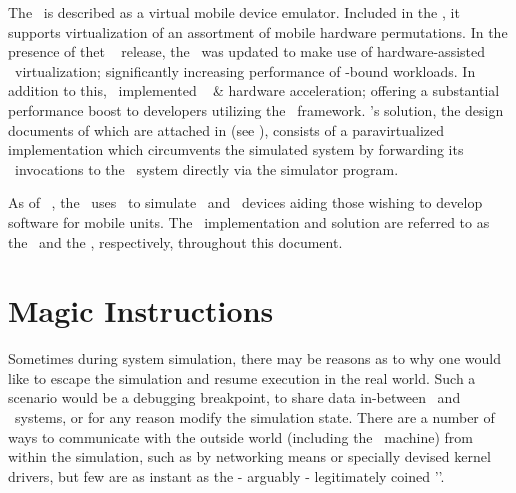 The \dvttermandroidemulator\ is described as a virtual mobile device emulator. Included in the \dvttermandroidsdk , it supports virtualization of an assortment of mobile hardware permutations.
In the presence of thet \dvttermandroid\  release, the \dvttermandroidsdk\ was updated to make use of hardware-assisted \dvttermxeightysix\ virtualization; significantly increasing performance of \dvttermcpu -bound workloads.
In addition to this, \dvttermgoogle\ implemented \dvttermopengles\  \&  hardware acceleration; offering a substantial performance boost to developers utilizing the \dvttermopengles\ framework.
\dvttermgoogle 's solution, the design documents of which are attached in  (see ), consists of a paravirtualized implementation which circumvents the simulated system by forwarding its \dvttermopengles\ invocations to the \dvttermhost\ system directly via the simulator program.

As of \dvttermandroid\ , the \dvttermandroidemulator\ uses \dvttermqemu\ to simulate \dvttermarm\ and \dvttermxeightysix\ devices aiding those wishing to develop software for mobile units.
The \dvttermandroidemulator\ implementation and solution are referred to as the \dvttermreferenceimplementation\ and the \dvttermreferencesolution , respectively, throughout this document.

\section*{Magic Instructions}
\label{sec:appendixa_magicinstructions}
Sometimes during system simulation, there may be reasons as to why one would like to escape the simulation and resume execution in the real world.
Such a scenario would be a debugging breakpoint, to share data in-between \dvttermtarget\ and \dvttermhost\ systems, or for any reason modify the simulation state.
There are a number of ways to communicate with the outside world (including the \dvttermhost\ machine) from within the simulation, such as by networking means or specially devised kernel drivers, but few are as instant as the - arguably - legitimately coined '\dvttermmagicinstruction '.

